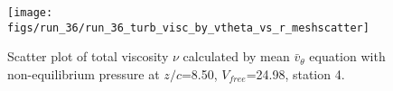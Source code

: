 \begin{figure}[H]
\centering
\texttt{[image: figs/run\_36/run\_36\_turb\_visc\_by\_vtheta\_vs\_r\_meshscatter]}
\caption{Scatter plot of total viscosity $\nu$ calculated by mean $\bar{v}_{\theta}$ equation with non-equilibrium pressure at $z/c$=8.50, $V_{free}$=24.98, station 4.}
\label{fig:run_36_turb_visc_by_vtheta_vs_r_meshscatter}
\end{figure}



